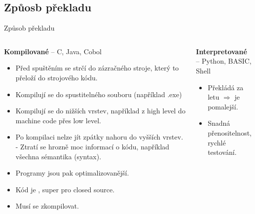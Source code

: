 \documentclass[aspectratio=169,xcolor=dvipsnames, t]{beamer}
\begin{document}
{\subsection{Způosb překladu}
\begin{frame}{Způsob překladu}
    \begin{columns}
        \begin{column}{0.7\textwidth}
            \textbf{Kompilované} -- C, Java, Cobol
            \begin{itemize}
                \item Před spuštěním se strčí do zázračného stroje, který to přeloží do strojového kódu.
                \item Kompilují se do spustitelného souboru (například .exe)
                \item Kompilují se do nižších vrstev, například z high level do machine code přes low level.
                \item Po kompilaci nelze jít zpátky nahoru do vyšších vrstev. - Ztratí se hrozně moc informací o kódu, například všechna sémantika (syntax).
                \item Programy jsou pak optimalizovanější.
                \item Kód je , super pro closed source.
                \item Musí se zkompilovat.
            \end{itemize}
        \end{column}
        \begin{column}{0.3\textwidth}
            \textbf{Interpretované} -- Python, BASIC, Shell
            \begin{itemize}
                \item Překládá za letu $\Rightarrow$ je pomalejší.
                \item Snadná přenositelnost, rychlé testování.
            \end{itemize}
        \end{column}
    \end{columns}
\end{frame}

}
\end{document}
